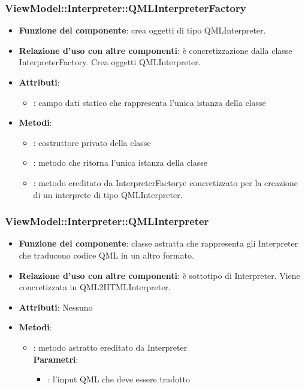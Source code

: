\subsubsection{ViewModel::Interpreter::QMLInterpreterFactory}
\begin{itemize}
\item\textbf{Funzione del componente}: crea oggetti di tipo QMLInterpreter.
	\item\textbf{Relazione d'uso con altre componenti}: è concretizzazione dalla classe InterpreterFactory. Crea oggetti QMLInterpreter.\\
\item\textbf{Attributi}:
	\begin{itemize}
		\item{}: campo dati statico che rappresenta l'unica istanza della classe\\
	\end{itemize}
\item\textbf{Metodi}:
	\begin{itemize}
		\item{}: costruttore privato della classe\\
		\item{}: metodo che ritorna l'unica istanza della classe\\
		\item{}: metodo ereditato da InterpreterFactorye concretizzato per la creazione di un interprete di tipo QMLInterpreter.\\
	\end{itemize}
\end{itemize}

\subsubsection{ViewModel::Interpreter::QMLInterpreter}
\begin{itemize}
\item\textbf{Funzione del componente}: classe astratta che rappresenta gli Interpreter che traducono codice QML in un altro formato.
	\item\textbf{Relazione d'uso con altre componenti}: è sottotipo di Interpreter. Viene concretizzata in QML2HTMLInterpreter.\\ 
\item\textbf{Attributi}: Nessuno
\item\textbf{Metodi}:
	\begin{itemize}
		\item{}: metodo astratto ereditato da Interpreter\\
		\textbf{Parametri}:
			\begin{itemize}
				\item{}: l'input QML che deve essere tradotto \\
			\end{itemize}
	\end{itemize}
\end{itemize}

